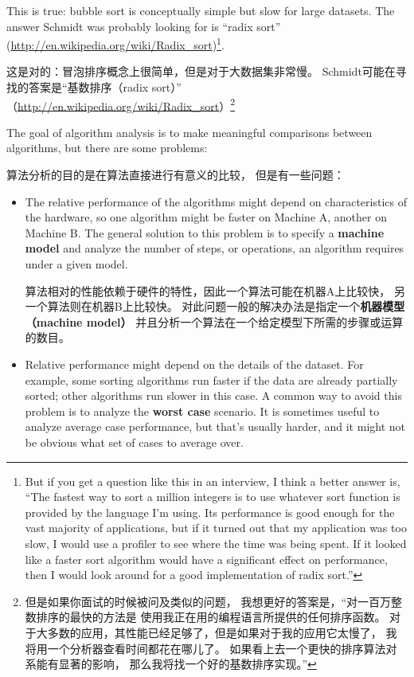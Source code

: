 \documentclass[10pt]{book}
\begin{document}
\begin{CJK}{UTF8}{gbsn}
This is true: bubble sort is conceptually simple but slow for
large datasets.  The answer Schmidt was probably looking for is
``radix sort'' (\url{http://en.wikipedia.org/wiki/Radix_sort})\footnote{
But if you get a question like this in an interview, I think
a better answer is, ``The fastest way to sort a million integers
is to use whatever sort function is provided by the language
I'm using.  Its performance is good enough for the vast majority
of applications, but if it turned out that my application was too
slow, I would use a profiler to see where the time was being
spent.  If it looked like a faster sort algorithm would have
a significant effect on performance, then I would look
around for a good implementation of radix sort.''}.

这是对的：冒泡排序概念上很简单，但是对于大数据集非常慢。
Schmidt可能在寻找的答案是``基数排序（radix sort）''
（\url{http://en.wikipedia.org/wiki/Radix_sort}）\footnote{
但是如果你面试的时候被问及类似的问题，
我想更好的答案是，``对一百万整数排序的最快的方法是
使用我正在用的编程语言所提供的任何排序函数。
对于大多数的应用，其性能已经足够了，但是如果对于我的应用它太慢了，
我将用一个分析器查看时间都花在哪儿了。
如果看上去一个更快的排序算法对系能有显著的影响，
那么我将找一个好的基数排序实现。''}

The goal of algorithm analysis is to make meaningful
comparisons between algorithms, but there are some problems:

算法分析的目的是在算法直接进行有意义的比较，
但是有一些问题：

\begin{itemize}

\item The relative performance of the algorithms might
depend on characteristics of the hardware, so one algorithm
might be faster on Machine A, another on Machine B.
The general solution to this problem is to specify a
{\bf machine model} and analyze the number of steps, or
operations, an algorithm requires under a given model.

算法相对的性能依赖于硬件的特性，因此一个算法可能在机器A上比较快，
另一个算法则在机器B上比较快。
对此问题一般的解决办法是指定一个{\bf 机器模型（machine model）}
并且分析一个算法在一个给定模型下所需的步骤或运算的数目。

\item Relative performance might depend on the details of
the dataset.  For example, some sorting
algorithms run faster if the data are already partially sorted;
other algorithms run slower in this case.
A common way to avoid this problem is to analyze the
{\bf worst case} scenario.  It is sometimes useful to
analyze average case performance, but that's usually harder,
and it might not be obvious what set of cases to average over.


\end{itemize}
\end{CJK}
\end{document}
